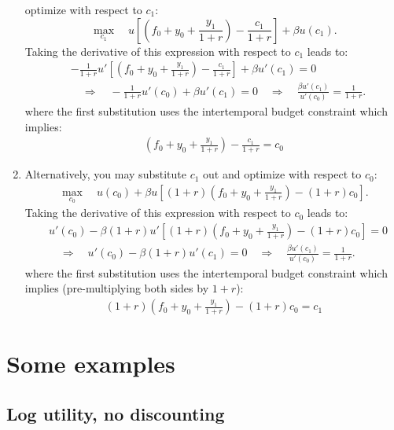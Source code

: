 \documentclass[]{book}
\theoremstyle{definition}
\theoremstyle{definition}
\theoremstyle{definition}
\theoremstyle{remark}
\begin{document}
\begin{enumerate}
  optimize with respect to \(c_{1}\):
  \[\max_{c_{1}}\quad u\left[\left(f_{0}+y_{0}+\frac{y_{1}}{1+r}\right)-\frac{c_{1}}{1+r}\right]+\beta u(c_{1}).\]
  Taking the derivative of this expression with respect to \(c_1\) leads
  to: \[
  \begin{aligned}
  &-\frac{1}{1+r} u'\left[\left(f_{0}+y_{0}+\frac{y_{1}}{1+r}\right)-\frac{c_{1}}{1+r}\right]+\beta u'(c_{1})=0\\
  &\quad\Rightarrow\quad-\frac{1}{1+r}u'(c_{0})+\beta u'(c_{1})=0\quad\Rightarrow\quad \boxed{\frac{\beta u'(c_{1})}{u'(c_{0})}=\frac{1}{1+r}}.
  \end{aligned}
  \] where the first substitution uses the intertemporal budget
  constraint which implies: \[
  \begin{aligned}
  \left(f_{0}+y_{0}+\frac{y_{1}}{1+r}\right)-\frac{c_{1}}{1+r}=c_0
  \end{aligned}
  \]
\item
  Alternatively, you may substitute \(c_{1}\) out and optimize with
  respect to \(c_{0}\): \[
  \begin{aligned}
  \max_{c_{0}}\quad u(c_{0})+\beta u\left[(1+r)\left(f_{0}+y_{0}+\frac{y_{1}}{1+r}\right)-(1+r)c_{0}\right].
  \end{aligned}
  \] Taking the derivative of this expression with respect to \(c_0\)
  leads to: \[
  \begin{aligned}
  &u'(c_{0})-\beta(1+r)u'\left[(1+r)\left(f_{0}+y_{0}+\frac{y_{1}}{1+r}\right)-(1+r)c_{0}\right]=0\\
  &\quad\Rightarrow\quad u'(c_{0})-\beta(1+r)u'(c_{1})=0\quad\Rightarrow\quad \boxed{\frac{\beta u'(c_{1})}{u'(c_{0})}=\frac{1}{1+r}}.
  \end{aligned}
  \] where the first substitution uses the intertemporal budget
  constraint which implies (pre-multiplying both sides by \(1+r\)): \[
  \begin{aligned}
  (1+r)\left(f_{0}+y_{0}+\frac{y_{1}}{1+r}\right)-(1+r)c_{0}=c_1
  \end{aligned}
  \]
\end{enumerate}

\section{Some examples}\label{some-examples}

\subsection{Log utility, no
discounting}\label{log-utility-no-discounting}
\end{document}
